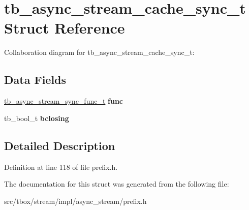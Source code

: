 \hypertarget{structtb__async__stream__cache__sync__t}{\section{tb\-\_\-async\-\_\-stream\-\_\-cache\-\_\-sync\-\_\-t Struct Reference}
\label{structtb__async__stream__cache__sync__t}
}


Collaboration diagram for tb\-\_\-async\-\_\-stream\-\_\-cache\-\_\-sync\-\_\-t\-:
\subsection*{Data Fields}
\begin{DoxyCompactItemize}
\item 
\hypertarget{structtb__async__stream__cache__sync__t_ac58d04ff43968f4cfb61739402fa147c}{\hyperlink{async__stream_8h_aa458907d6087a31b50edc3633800ea6c}{tb\-\_\-async\-\_\-stream\-\_\-sync\-\_\-func\-\_\-t} {\bfseries func}}\label{structtb__async__stream__cache__sync__t_ac58d04ff43968f4cfb61739402fa147c}

\item 
\hypertarget{structtb__async__stream__cache__sync__t_a5fd407c06ad333a56ba00fc2087e865c}{tb\-\_\-bool\-\_\-t {\bfseries bclosing}}\label{structtb__async__stream__cache__sync__t_a5fd407c06ad333a56ba00fc2087e865c}

\end{DoxyCompactItemize}


\subsection{Detailed Description}


Definition at line 118 of file prefix.\-h.



The documentation for this struct was generated from the following file\-:\begin{DoxyCompactItemize}
\item 
src/tbox/stream/impl/async\-\_\-stream/prefix.\-h\end{DoxyCompactItemize}
